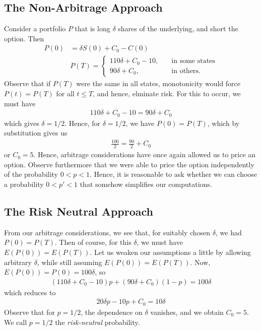\documentclass[12pt]{article}
\theoremstyle{plain}
\theoremstyle{definition}
\theoremstyle{remark}
\numberwithin{equation}{section}  %
\begin{document}
\subsection{The Non-Arbitrage Approach}
Consider a portfolio $P$
that is long $\delta$ shares of the underlying, and short the option.
Then
\begin{equation*}
\begin{split}
P(0) & = \delta S(0) + C_{0} - C(0)
\\
& P(T) = \begin{cases}
	110 \delta + C_{0} - 10, \quad & \text{in some states}
	\\
	90 \delta + C_{0}, \quad & \text{in others}.
\end{cases}
\end{split}
\end{equation*}
Observe that if $P(T)$ were the same in all states, monotonicity would force
$P(t) = P(T)$ for all $t \le T$, and hence, elminate risk. For this to occur,
we must have
\begin{equation*}
\begin{split}
110 \delta + C_{0} - 10 = 90 \delta + C_{0}
\end{split}
\end{equation*}
which gives $\delta = 1/2$. Hence, for $\delta = 1/2$, we have
$P(0) = P(T)$, which by substitution gives us
\begin{equation*}
\begin{split}
\frac{100}{2} = \frac{90}{2} + C_{0}
\end{split}
\end{equation*}
or $C_{0} = 5$. Hence, arbitrage considerations have once again
allowed us to price an option. Observe furthermore that we were able
to price the option independently of the probability $0 < p < 1$. 
Hence, it is reasonable to ask whether we can choose a probability
$0 < p' < 1$ that somehow simplifies our computations.
\subsection{The Risk Neutral Approach}
From our arbitrage considerations, we see that, for suitably chosen
$\delta$, we had $P(0) = P(T)$. Then of course, for this $\delta$, we must
have $E(P(0)) = E(P(T))$. Let us weaken our assumptions a little by allowing
arbitrary $\delta$, while still assuming $E(P(0)) = E(P(T))$. 
Now, $E(P(0)) = P(0) = 100 \delta$, so
\begin{equation*}
\begin{split}
(110 \delta + C_{0} - 10) p + (90 \delta + C_{0}) (1- p) = 100 \delta
\end{split}
\end{equation*}
which reduces to
\begin{equation*}
\begin{split}
20 \delta p - 10p + C_{0} = 10 \delta
\end{split}
\end{equation*}
Observe that for $p = 1/2$, the dependence on $\delta$ vanishes, and we obtain
$C_{0} = 5$. We call $p = 1/2$ the \emph{risk-neutral} probability.
\end{document}
